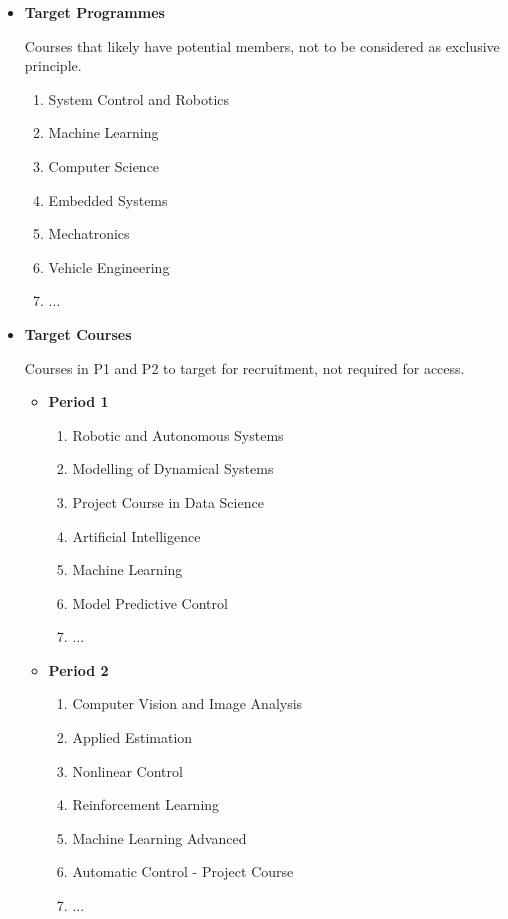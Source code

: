 \documentclass[graybox]{svmult}
\begin{document}
\begin{itemize}
  \item \textbf{Target Programmes}
  
  Courses that likely have potential members, not to be considered as exclusive principle.
  
  \begin{enumerate}
    \item System Control and Robotics
    \item Machine Learning
    \item Computer Science
    \item Embedded Systems
    \item Mechatronics
    \item Vehicle Engineering
    \item ...
  \end{enumerate}

  \item \textbf{Target Courses}
  
  Courses in P1 and P2 to target for recruitment, not required for access.
  
  \begin{itemize}
    \item \textbf{Period 1}
    \begin{enumerate}
      \item Robotic and Autonomous Systems
      \item Modelling of Dynamical Systems
      \item Project Course in Data Science
      \item Artificial Intelligence
      \item Machine Learning
      \item Model Predictive Control
      \item ...
    \end{enumerate}
    \item \textbf{Period 2}
    \begin{enumerate}
      \item Computer Vision and Image Analysis
      \item Applied Estimation
      \item Nonlinear Control
      \item Reinforcement Learning
      \item Machine Learning Advanced
      \item Automatic Control - Project Course
      \item ...
    \end{enumerate}
  \end{itemize}
\end{itemize}
\end{document}
